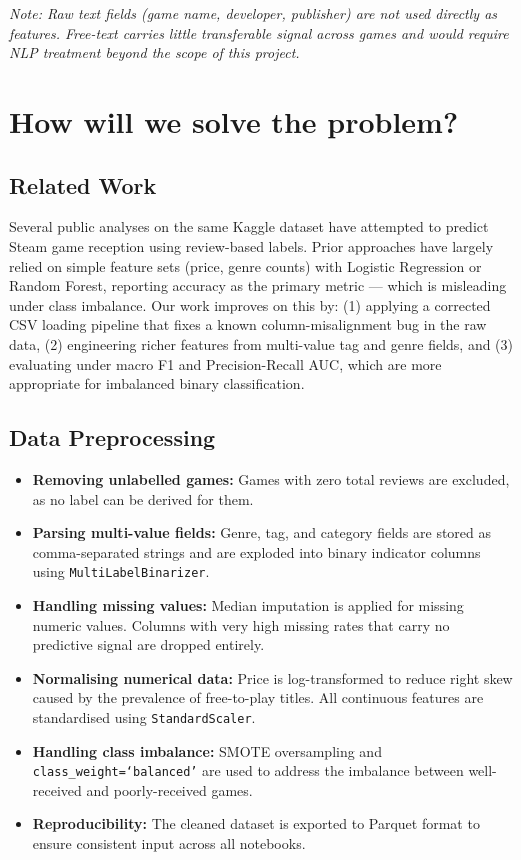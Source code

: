 \documentclass[11pt, a4paper]{article}
\begin{document}
\noindent\textit{Note: Raw text fields (game name, developer, publisher) are not used
directly as features. Free-text carries little transferable signal across games and
would require NLP treatment beyond the scope of this project.}

\section{How will we solve the problem?}

\subsection{Related Work}

Several public analyses on the same Kaggle dataset have attempted to predict Steam
game reception using review-based labels. Prior approaches have largely relied on
simple feature sets (price, genre counts) with Logistic Regression or Random Forest,
reporting accuracy as the primary metric --- which is misleading under class imbalance.
Our work improves on this by: (1) applying a corrected CSV loading pipeline that
fixes a known column-misalignment bug in the raw data, (2) engineering richer
features from multi-value tag and genre fields, and (3) evaluating under macro F1
and Precision-Recall AUC, which are more appropriate for imbalanced binary
classification.

\subsection{Data Preprocessing}

\begin{itemize}
  \item \textbf{Removing unlabelled games:} Games with zero total reviews are excluded,
        as no label can be derived for them.
  \item \textbf{Parsing multi-value fields:} Genre, tag, and category fields are
        stored as comma-separated strings and are exploded into binary indicator
        columns using \texttt{MultiLabelBinarizer}.
  \item \textbf{Handling missing values:} Median imputation is applied for missing
        numeric values. Columns with very high missing rates that carry no predictive
        signal are dropped entirely.
  \item \textbf{Normalising numerical data:} Price is log-transformed to reduce right
        skew caused by the prevalence of free-to-play titles. All continuous features
        are standardised using \texttt{StandardScaler}.
  \item \textbf{Handling class imbalance:} SMOTE oversampling and
        \texttt{class\_weight=`balanced'} are used to address the imbalance between
        well-received and poorly-received games.
  \item \textbf{Reproducibility:} The cleaned dataset is exported to Parquet format
        to ensure consistent input across all notebooks.
\end{itemize}
\end{document}
